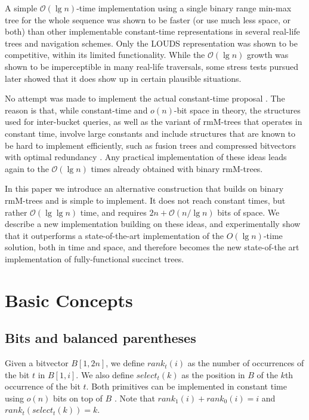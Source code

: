 \documentclass[11pt]{article}
\renewcommand{\log}{\lg}
\newcommand{\0}{\mathit{0}}
\newcommand{\1}{\mathit{1}}
\newcommand{\rank}{\mathit{rank}}
\newcommand{\select}{\mathit{select}}
\newcommand{\Oh}[1]{\mathcal{O}\!\left(#1\right)}
\begin{document}
A simple $\Oh{\log n}$-time implementation using a single binary range min-max 
tree for the whole sequence \cite{ACNS10} was shown to be faster (or use much less space, or both)
than other implementable constant-time representations \cite{GRRR06} in several
real-life trees and navigation schemes. Only the LOUDS representation was
shown to be competitive, within its limited functionality. 
While the $\Oh{\log n}$ growth was shown to be imperceptible in many real-life
traversals, some stress tests pursued later \cite{JR12} showed
that it does show up in certain plausible situations.

No attempt was made to implement the actual constant-time proposal \cite{NS14}.
The reason is that, while constant-time and $o(n)$-bit space in theory, the 
structures used for inter-bucket queries, as well as the variant of rmM-trees 
that operates in constant time, involve large constants and include structures
that are known to be hard to implement efficiently, such as fusion 
trees \cite{FW93} and compressed bitvectors with optimal redundancy 
\cite{Pat08}. Any practical
implementation of these ideas leads again to the $\Oh{\log n}$ times already
obtained with binary rmM-trees.

In this paper we introduce an alternative construction that builds on binary
rmM-trees and is simple to implement. It does not reach constant times, but
rather $\Oh{\log\log n}$ time, and requires $2n+\Oh{n/\log n}$ bits of space.
We describe a new implementation building on these ideas, and experimentally 
show that it outperforms a state-of-the-art implementation of the 
$O(\log n)$-time solution, both in time and space, and therefore becomes the
new state-of-the art implementation of fully-functional succinct trees.

\section{Basic Concepts}

\subsection{Bits and balanced parentheses}

Given a bitvector $B[1,2n]$, we define $\rank_t(i)$ as the number of 
occurrences of the bit $t$ in $B[1,i]$. We also define $\select_t(k)$ as
the position in $B$ of the $k$th occurrence of the bit $t$. Both primitives
can be implemented in constant time using $o(n)$ bits on top of $B$ 
\cite{Cla96}. Note that $\rank_1(i)+\rank_0(i)=i$ and $\rank_t(\select_t(k))=k$.
\end{document}
